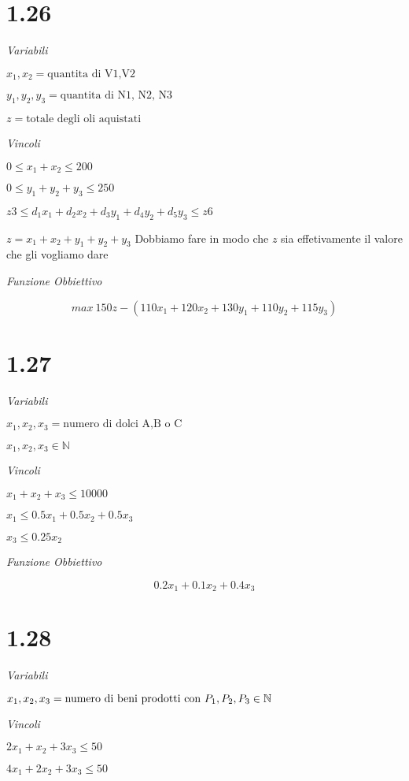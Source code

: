 \section{1.26}

\textit{Variabili}

$ x_1,x_2 = \text{quantita di V1,V2} $

$ y_1,y_2,y_3 = \text{quantita di N1, N2, N3} $

$ z = \text{totale degli oli aquistati} $

\textit{Vincoli}

$ 0 \leq x_1 + x_2 \leq 200 $

$ 0 \leq y_1 + y_2 + y_3 \leq 250 $

$ z 3 \leq d_1x_1 + d_2x_2 + d_3y_1 + d_4y_2 + d_5y_3 \leq z 6  $

$ z = x_1 + x_2 + y_1 + y_2 + y_3 $ Dobbiamo fare in modo che $ z $ sia effetivamente il valore che gli vogliamo dare

\textit{Funzione Obbiettivo}

\[
 max\ 150 z - (110 x_1 + 120 x_2 + 130 y_1 + 110 y_2 + 115 y_3)
\]

\section{1.27}

\textit{Variabili}

$ x_1, x_2, x_3 = \text{numero di dolci A,B o C} $

$ x_1,x_2, x_3 \in \mathbb{N} $

\textit{Vincoli}

$ x_1 + x_2 + x_3 \leq 10000 $

$ x_1 \leq 0.5 x_1 + 0.5 x_2 + 0.5 x_3 $

$ x_3 \leq 0.25 x_2 $

\textit{Funzione Obbiettivo}

\[
0.2 x_1 + 0.1 x_2 + 0.4 x_3
\]

\section{1.28}

\textit{Variabili}

$ x_1,x_2,x_3 = \text{numero di beni prodotti con $ P_1, P_2, P_3 $} \in \mathbb{N} $

\textit{Vincoli}

$ 2x_1 + x_2 + 3x_3 \leq 50 $

$ 4x_1 + 2x_2 + 3x_3 \leq 50$

